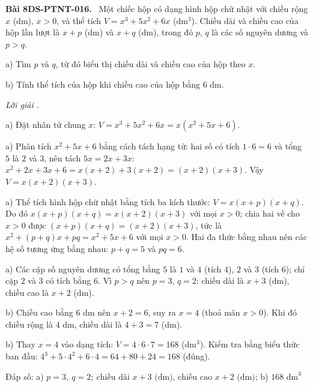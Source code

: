 \documentclass[12pt,a4paper]{article}
\newenvironment{problem}[1][]{\par\medskip\noindent\textbf{Bài #1.}\ }{\par}
\newenvironment{solution}[1][]{\par\noindent\textit{Lời giải #1.}\par}{\par}
\begin{document}
\begin{problem}[8DS-PTNT-016]
Một chiếc hộp có dạng hình hộp chữ nhật với chiều rộng $x$ (dm), $x > 0$, và thể tích $V = x^3 + 5x^2 + 6x$ (dm$^3$). Chiều dài và chiều cao của hộp lần lượt là $x + p$ (dm) và $x + q$ (dm), trong đó $p$, $q$ là các số nguyên dương và $p > q$.

a) Tìm $p$ và $q$, từ đó biểu thị chiều dài và chiều cao của hộp theo $x$.

b) Tính thể tích của hộp khi chiều cao của hộp bằng $6$ dm.

\begin{solution}
a) Đặt nhân tử chung $x$: $V = x^3 + 5x^2 + 6x = x(x^2 + 5x + 6)$.

a) Phân tích $x^2 + 5x + 6$ bằng cách tách hạng tử: hai số có tích $1 \cdot 6 = 6$ và tổng $5$ là $2$ và $3$, nên tách $5x = 2x + 3x$: $x^2 + 2x + 3x + 6 = x(x + 2) + 3(x + 2) = (x + 2)(x + 3)$. Vậy $V = x(x + 2)(x + 3)$.

a) Thể tích hình hộp chữ nhật bằng tích ba kích thước: $V = x(x + p)(x + q)$. Do đó $x(x + p)(x + q) = x(x + 2)(x + 3)$ với mọi $x > 0$; chia hai vế cho $x > 0$ được $(x + p)(x + q) = (x + 2)(x + 3)$, tức là $x^2 + (p + q)x + pq = x^2 + 5x + 6$ với mọi $x > 0$. Hai đa thức bằng nhau nên các hệ số tương ứng bằng nhau: $p + q = 5$ và $pq = 6$.

a) Các cặp số nguyên dương có tổng bằng $5$ là $1$ và $4$ (tích $4$), $2$ và $3$ (tích $6$); chỉ cặp $2$ và $3$ có tích bằng $6$. Vì $p > q$ nên $p = 3$, $q = 2$: chiều dài là $x + 3$ (dm), chiều cao là $x + 2$ (dm).

b) Chiều cao bằng $6$ dm nên $x + 2 = 6$, suy ra $x = 4$ (thoả mãn $x > 0$). Khi đó chiều rộng là $4$ dm, chiều dài là $4 + 3 = 7$ (dm).

b) Thay $x = 4$ vào dạng tích: $V = 4 \cdot 6 \cdot 7 = 168$ (dm$^3$). Kiểm tra bằng biểu thức ban đầu: $4^3 + 5 \cdot 4^2 + 6 \cdot 4 = 64 + 80 + 24 = 168$ (đúng).

Đáp số: a) $\boxed{p = 3,\ q = 2;\ \text{chiều dài } x + 3 \text{ (dm), chiều cao } x + 2 \text{ (dm)}}$; b) $\boxed{168 \text{ dm}^3}$
\end{solution}
\end{problem}
\end{document}
